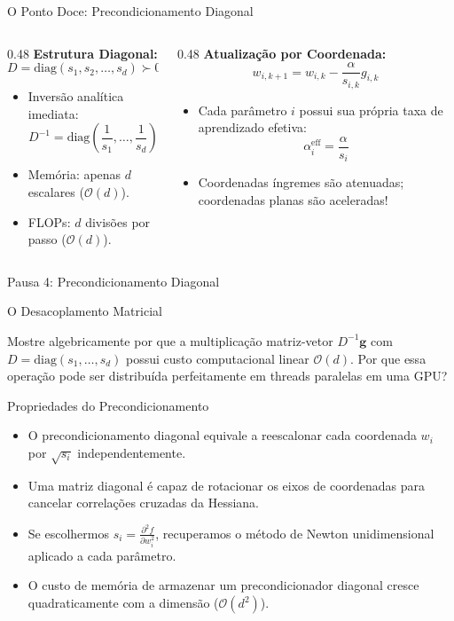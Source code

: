 \documentclass[aspectratio=169, 10pt]{beamer}
\newenvironment{callouttip}[1][Dica]{%
  \begin{exampleblock}{#1}%
}{%
  \end{exampleblock}%
}
\newcommand{\qmark}{\textbf{$\square$}}
\begin{document}
\begin{frame}{O Ponto Doce: Precondicionamento Diagonal}
  \begin{columns}[T]
    \begin{column}{0.48\textwidth}
      \textbf{Estrutura Diagonal:}
      \[D = \text{diag}(s_1, s_2, \dots, s_d) \succ 0\]
      \begin{itemize}
        \item Inversão analítica imediata:
        \[D^{-1} = \text{diag}\left(\frac{1}{s_1}, \dots, \frac{1}{s_d}\right)\]
        \item Memória: apenas $d$ escalares ($\mathcal{O}(d)$).
        \item FLOPs: $d$ divisões por passo ($\mathcal{O}(d)$).
      \end{itemize}
    \end{column}
    \begin{column}{0.48\textwidth}
      \textbf{Atualização por Coordenada:}
      \[w_{i, k+1} = w_{i, k} - \frac{\alpha}{s_{i, k}} g_{i, k}\]
      \begin{itemize}
        \item Cada parâmetro $i$ possui sua própria taxa de aprendizado efetiva:
        \[\alpha_i^{\text{eff}} = \frac{\alpha}{s_i}\]
        \item Coordenadas íngremes são atenuadas; coordenadas planas são aceleradas!
      \end{itemize}
    \end{column}
  \end{columns}
\end{frame}

\begin{frame}{Pausa 4: Precondicionamento Diagonal}
  \begin{callouttip}[O Desacoplamento Matricial]
    Mostre algebricamente por que a multiplicação matriz-vetor $D^{-1}\mathbf{g}$ com $D = \text{diag}(s_1, \dots, s_d)$ possui custo computacional linear $\mathcal{O}(d)$. Por que essa operação pode ser distribuída perfeitamente em threads paralelas em uma GPU?
  \end{callouttip}

  \begin{callouttip}[Propriedades do Precondicionamento]
    \begin{itemize}
      \item[\qmark] O precondicionamento diagonal equivale a reescalonar cada coordenada $w_i$ por $\sqrt{s_i}$ independentemente.
      \item[\qmark] Uma matriz diagonal é capaz de rotacionar os eixos de coordenadas para cancelar correlações cruzadas da Hessiana.
      \item[\qmark] Se escolhermos $s_i = \frac{\partial^2 f}{\partial w_i^2}$, recuperamos o método de Newton unidimensional aplicado a cada parâmetro.
      \item[\qmark] O custo de memória de armazenar um precondicionador diagonal cresce quadraticamente com a dimensão ($\mathcal{O}(d^2)$).
    \end{itemize}
  \end{callouttip}
\end{frame}
\end{document}
